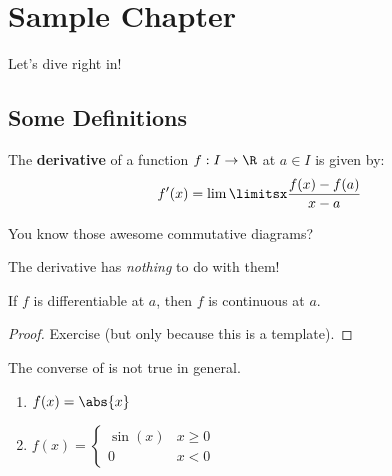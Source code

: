 \section{Sample Chapter}
Let's dive right in!

\subsection{Some Definitions}
\begin{definition}
The \textbf{derivative} of a function $f:I\to\R$ at $a\in I$ is given by:
\begin{equation*}
    f'(x)=\lim\limitsx\frac{f(x)-f(a)}{x-a}
\end{equation*}
\end{definition}

\begin{center}
You know those awesome commutative diagrams?


The derivative has \emph{nothing} to do with them!
\end{center}

\begin{proposition}\label{diffcont}
If $f$ is differentiable at $a$, then $f$ is continuous at $a$.
\end{proposition}
\begin{proof}
Exercise (but only because this is a template).
\end{proof}

The converse of  is not true in general.

\begin{examples}\leavevmode %
\begin{enumerate}
    \item $f(x)=\abs{x}$
    \item $f(x)=\begin{cases} \sin(x) & x\ge 0 \\ 0 & x<0 \end{cases}$
\end{enumerate}
\end{examples}

